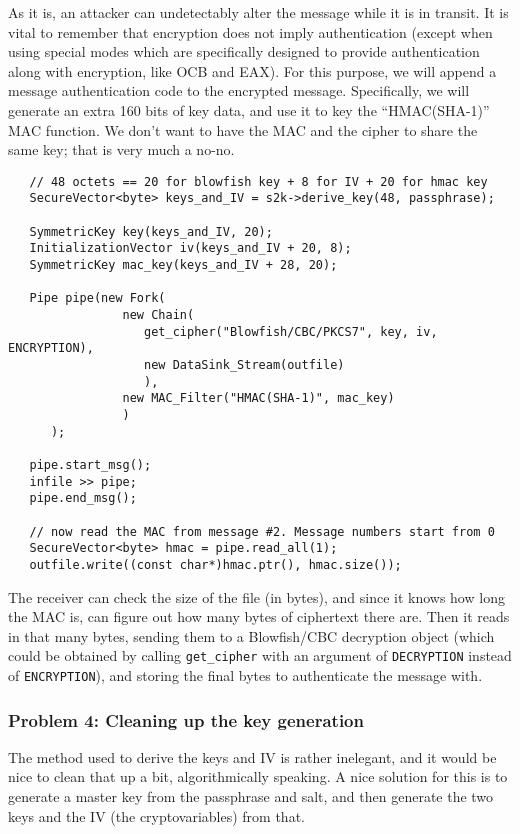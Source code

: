 \documentclass{article}
\newcommand{\type}[1]{\texttt{#1}}
\begin{document}
As it is, an attacker can undetectably alter the message while it is in
transit. It is vital to remember that encryption does not imply authentication
(except when using special modes which are specifically designed to provide
authentication along with encryption, like OCB and EAX). For this purpose, we
will append a message authentication code to the encrypted
message. Specifically, we will generate an extra 160 bits of key data, and use
it to key the ``HMAC(SHA-1)'' MAC function. We don't want to have the MAC and
the cipher to share the same key; that is very much a no-no.

\begin{verbatim}
   // 48 octets == 20 for blowfish key + 8 for IV + 20 for hmac key
   SecureVector<byte> keys_and_IV = s2k->derive_key(48, passphrase);

   SymmetricKey key(keys_and_IV, 20);
   InitializationVector iv(keys_and_IV + 20, 8);
   SymmetricKey mac_key(keys_and_IV + 28, 20);

   Pipe pipe(new Fork(
                new Chain(
                   get_cipher("Blowfish/CBC/PKCS7", key, iv, ENCRYPTION),
                   new DataSink_Stream(outfile)
                   ),
                new MAC_Filter("HMAC(SHA-1)", mac_key)
                )
      );

   pipe.start_msg();
   infile >> pipe;
   pipe.end_msg();

   // now read the MAC from message #2. Message numbers start from 0
   SecureVector<byte> hmac = pipe.read_all(1);
   outfile.write((const char*)hmac.ptr(), hmac.size());
\end{verbatim}

The receiver can check the size of the file (in bytes), and since it knows how
long the MAC is, can figure out how many bytes of ciphertext there are. Then it
reads in that many bytes, sending them to a Blowfish/CBC decryption object
(which could be obtained by calling \verb|get_cipher| with an argument of
\type{DECRYPTION} instead of \type{ENCRYPTION}), and storing the final bytes to
authenticate the message with.

\subsubsection{Problem 4: Cleaning up the key generation}

The method used to derive the keys and IV is rather inelegant, and it would be
nice to clean that up a bit, algorithmically speaking. A nice solution for this
is to generate a master key from the passphrase and salt, and then generate the
two keys and the IV (the cryptovariables) from that.
\end{document}
